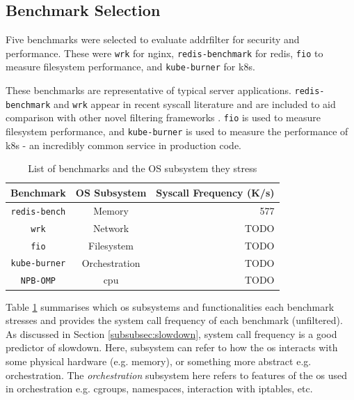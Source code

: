 \subsection{Benchmark Selection}


Five benchmarks were selected to evaluate addrfilter for security and
performance. These were \texttt{wrk} for nginx, \texttt{redis-benchmark} for
redis, \texttt{fio} to measure filesystem performance, and \texttt{kube-burner}
for \ac{k8s}. 

These benchmarks are representative of typical server applications.
\texttt{redis-benchmark} and \texttt{wrk} appear in recent syscall
literature and are included to aid comparison with other novel filtering
frameworks \cite{OPTIMUS, SYSPART, SYSFILTER}. \texttt{fio} is used to
measure filesystem performance, and \texttt{kube-burner} is used to 
measure the performance of \ac{k8s} - an incredibly common service in 
production code. 

\begin{table}[H]
    \centering
    \begin{tabular}{ccr}
        \toprule
        Benchmark & OS Subsystem & Syscall Frequency (K/s) \\
        \midrule
        \texttt{redis-bench} & Memory & 577 \\
        \texttt{wrk} & Network & TODO \\
        \texttt{fio} & Filesystem & TODO \\
        \texttt{kube-burner} & Orchestration & TODO \\
        \texttt{NPB-OMP} & \ac{cpu} & TODO \\
    \end{tabular}
    \caption{List of benchmarks and the OS subsystem they
    stress}\label{table:benchmark-selection}
\end{table}

Table \ref{table:benchmark-selection} summarises which \ac{os}
subsystems and functionalities each benchmark stresses and provides the system call frequency of each
benchmark (unfiltered). As discussed in Section \ref{subsubsec:slowdown}, system
call frequency is a good predictor of slowdown. Here, subsystem can refer to how
the \ac{os} interacts with some physical hardware (e.g. memory), or something
more abstract e.g. orchestration. The \textit{orchestration} subsystem here
refers to features of the \ac{os} used in orchestration e.g. cgroups,
namespaces, interaction with iptables, etc.

